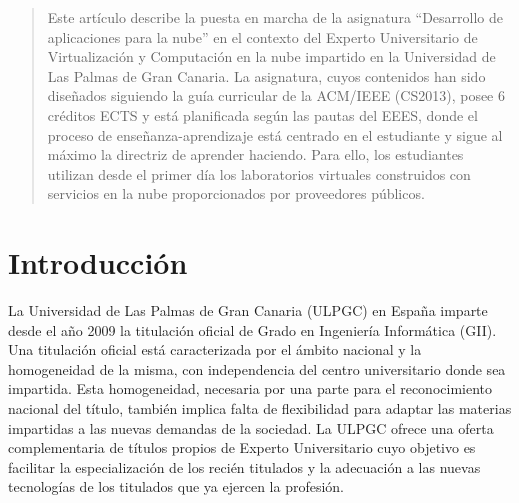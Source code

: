 \documentclass[conference]{IEEEtran}
\begin{document}
\begin{abstract}
Este artículo describe la puesta en marcha de la asignatura ``Desarrollo de aplicaciones para la nube'' en el contexto del 
Experto Universitario de Virtualización y Computación en la nube impartido en la Universidad de Las Palmas de Gran Canaria.
La asignatura, cuyos contenidos han sido diseñados siguiendo la guía curricular de la ACM/IEEE (CS2013), posee 6 créditos ECTS 
y está planificada según las pautas del EEES, donde el proceso de enseñanza-aprendizaje está centrado en el estudiante y sigue 
al máximo la directriz de aprender haciendo. Para ello, los estudiantes utilizan desde el primer día los laboratorios virtuales 
construidos con servicios en la nube proporcionados por proveedores públicos.

\end{abstract}





%
\IEEEpeerreviewmaketitle



\section{Introducción}

La Universidad de Las Palmas de Gran Canaria (ULPGC) en España imparte desde el
año 2009 la titulación oficial de Grado en Ingeniería Informática (GII). Una
titulación oficial está caracterizada por el ámbito nacional y la
homogeneidad de la misma, con independencia del centro universitario
donde sea impartida. Esta homogeneidad, necesaria por una parte
para el reconocimiento nacional del título, también implica falta de
flexibilidad para adaptar las materias impartidas a las nuevas demandas de la
sociedad. La ULPGC ofrece
una oferta complementaria de títulos propios de Experto Universitario cuyo objetivo es
facilitar la especialización de los recién titulados
y la adecuación a las nuevas tecnologías de los titulados que ya ejercen la profesión.
\end{document}
